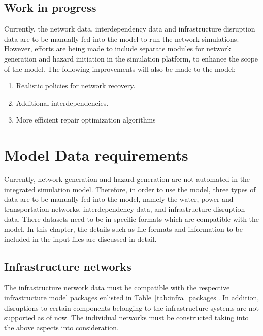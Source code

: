 \documentclass[letterpaper,12pt,english]{sphinxmanual}
\begin{document}
\section{Work in progress}
Currently, the network data, interdependency data and infrastructure disruption data are to be manually fed into the model to run the network simulations.
However, efforts are being made to include separate modules for network generation and hazard initiation in the simulation platform, to enhance the scope of the model.
The following improvements will also be made to the model:
\begin{enumerate}[noitemsep]
\item Realistic policies for network recovery.
\item Additional interdependencies.
\item More efficient repair optimization algorithms
\end{enumerate}

\chapter{Model Data requirements}

Currently, network generation and hazard generation are not automated in the integrated simulation model. Therefore, in order to use the model, three types of data are to be manually fed into the model, namely the water, power and transportation networks, interdependency data, and infrastructure disruption data. There datasets need to be in specific formats which are compatible with the model. In this chapter, the details such as file formats and information to be included in the input files are discussed in detail. 

\section{Infrastructure networks}
The infrastructure network data must be compatible with the respective infrastructure model packages enlisted in Table~\ref{tab:infra_packages}. In addition, disruptions to certain components belonging to the infrastructure systems are not supported as of now. The individual networks must be constructed taking into the above aspects into consideration.
\end{document}
